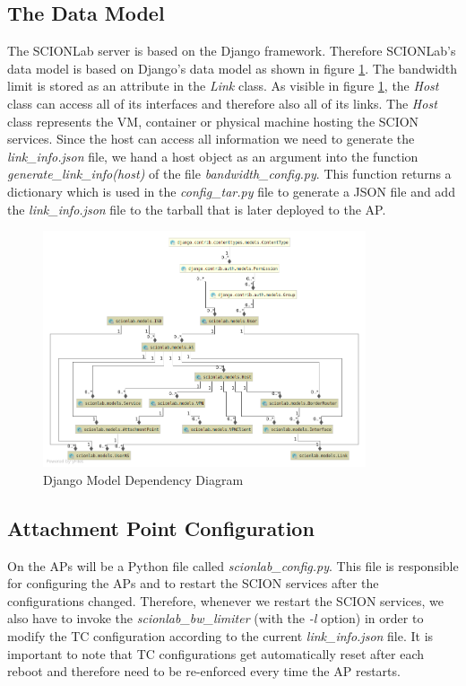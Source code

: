 \newpage
\subsection{The Data Model}

The \acs{SCIONLab} server is based on the Django framework. Therefore \acs{SCIONLab}'s data model is based on Django's data model as shown in figure \ref{Django Model Dependency Diagram}. The bandwidth limit is stored as an attribute in the \textit{Link} class. As visible in figure \ref{Django Model Dependency Diagram}, the \textit{Host} class can access all of its interfaces and therefore also all of its links. The \textit{Host} class represents the \acs{VM}, container or physical machine hosting the \acs{SCION} services. Since the host can access all information we need to generate the \textit{link\_info.json} file, we hand a host object as an argument into the function \textit{generate\_link\_info(host)} of the file \textit{bandwidth\_config.py}. This function returns a dictionary which is used in the \textit{config\_tar.py} file to generate a \acs{JSON} file and add the \textit{link\_info.json} file to the tarball that is later deployed to the \acl{AP}.

\begin{figure}[H]
	\centering
	\includegraphics[width=0.85\textwidth]{img/Django_diagram.png}
	\caption{Django Model Dependency Diagram}
	\label{Django Model Dependency Diagram}
\end{figure}

\subsection{Attachment Point Configuration}

On the \aclp{AP} will be a Python file called \textit{scionlab\_config.py}. This file is responsible for configuring the \acsp{AP} and to restart the \acs{SCION} services after the configurations changed. Therefore, whenever we restart the \acs{SCION} services, we also have to invoke the \textit{scionlab\_bw\_limiter} (with the \textit{-l} option) in order to modify the \acs{TC} configuration according to the current \textit{link\_info.json} file. It is important to note that \acs{TC} configurations get automatically reset after each reboot and therefore need to be re-enforced every time the \acs{AP} restarts.

